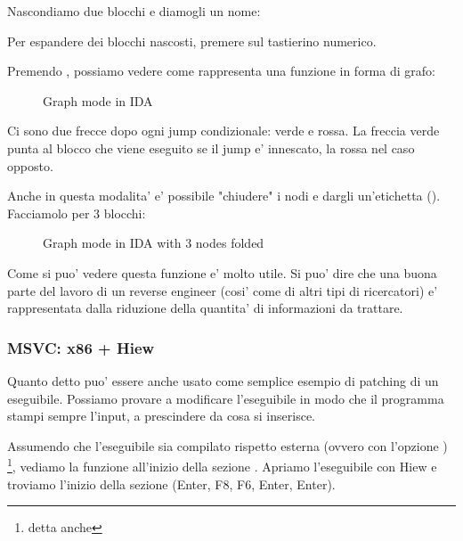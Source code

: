 Nascondiamo due blocchi e diamogli un nome:



Per espandere dei blocchi nascosti, premere \q{+} sul tastierino numerico.

\clearpage
Premendo , possiamo vedere come \IDA rappresenta una funzione in forma di grafo:

\begin{figure}[H]
\centering
{}
\caption{Graph mode in IDA}
\label{fig:ex3_IDA_1}
\end{figure}

Ci sono due frecce dopo ogni jump condizionale: verde e rossa.
La freccia verde punta al blocco che viene eseguito se il jump e' innescato, la rossa nel caso opposto.

\clearpage
Anche in questa modalita' e' possibile "chiudere" i nodi e dargli un'etichetta ().
Facciamolo per 3 blocchi:

\begin{figure}[H]
\centering
{}
\caption{Graph mode in IDA with 3 nodes folded}
\label{fig:ex3_IDA_2}
\end{figure}

Come si puo' vedere questa funzione e' molto utile.
Si puo' dire che una buona parte del lavoro di un reverse engineer (cosi' come di altri tipi di ricercatori) e' rappresentata dalla riduzione della quantita' di informazioni da trattare.



\clearpage
\subsubsection{MSVC: x86 + Hiew}

Quanto detto puo' essere anche usato come semplice esempio di patching di un eseguibile.
Possiamo provare a modificare l'eseguibile in modo che il programma stampi sempre l'input, a prescindere da cosa si inserisce.

Assumendo che l'eseguibile sia compilato rispetto  esterna (ovvero con l'opzione )
\footnote{detta anche }, 
vediamo la funzione \main all'inizio della sezione .
Apriamo l'eseguibile con Hiew e troviamo l'inizio della sezione  (Enter, F8, F6, Enter, Enter).

